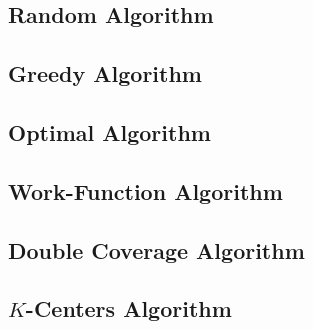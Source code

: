 
\subsection*{Random Algorithm}
\label{sec:rand}

\subsection*{Greedy Algorithm}
\label{sec:greedy}

\subsection*{Optimal Algorithm}
\label{sec:OPT}

\subsection*{Work-Function Algorithm}
\label{sec:WFA}

\subsection*{Double Coverage Algorithm}
\label{sec:DC}

\subsection*{$K$-Centers Algorithm}
\label{sec:KC}